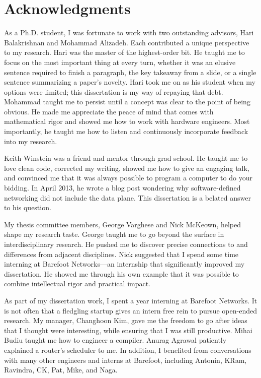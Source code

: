 \chapter*{Acknowledgments}
%

As a Ph.D. student, I was fortunate to work with two outstanding advisors, Hari
Balakrishnan and Mohammad Alizadeh. Each contributed a unique perspective to my
research.  Hari was the master of the highest-order bit. He taught me to focus
on the most important thing at every turn, whether it was an elusive sentence
required to finish a paragraph, the key takeaway from a slide, or a single
sentence summarizing a paper's novelty. Hari took me on as his student when my
options were limited; this dissertation is my way of repaying that debt.
Mohammad taught me to persist until a concept was clear to the point of being
obvious. He made me appreciate the peace of mind that comes with mathematical
rigor and showed me how to work with hardware engineers.  Most importantly, he
taught me how to listen and continuously incorporate feedback into my research.

Keith Winstein was a friend and mentor through grad school. He taught me to
love clean code, corrected my writing, showed me how to give an engaging talk,
and convinced me that it was always possible to program a computer to do your
bidding. In April 2013, he wrote a blog post wondering why software-defined
networking did not include the data plane. This dissertation is a belated
answer to his question.

My thesis committee members, George Varghese and Nick McKeown, helped shape my
research taste. George taught me to go beyond the surface in interdisciplinary
research. He pushed me to discover precise connections to and differences from
adjacent disciplines. Nick suggested that I spend some time interning at
Barefoot Networks---an internship that significantly improved my dissertation.
He showed me through his own example that it was possible to combine
intellectual rigor and practical impact.

As part of my dissertation work, I spent a year interning at Barefoot Networks.
It is not often that a fledgling startup gives an intern free rein to pursue
open-ended research. My manager, Changhoon Kim, gave me the freedom to go after
ideas that I thought were interesting, while ensuring that I was still
productive.  Mihai Budiu taught me how to engineer a compiler. Anurag Agrawal
patiently explained a router's scheduler to me. In addition, I benefited from
conversations with many other engineers and interns at Barefoot, including
Antonin, KRam, Ravindra, CK, Pat, Mike, and Naga.

